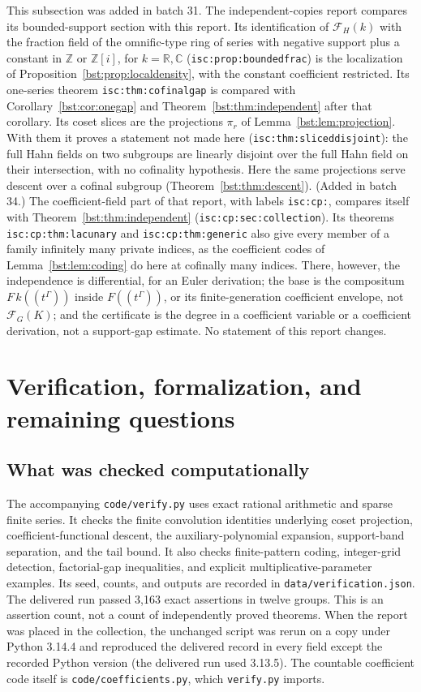 \documentclass[11pt,letterpaper]{article}
\theoremstyle{definition}
\theoremstyle{remark}
\newcommand{\R}{\mathbb R}
\newcommand{\C}{\mathbb C}
\newcommand{\Z}{\mathbb Z}
\newcommand{\FF}[2]{\mathcal F_{#2}(#1)}
\begin{document}
This subsection was added in batch 31. The independent-copies report
\cite{RepoIsc} compares its bounded-support section with this report. Its
identification of $\FF kH$ with the fraction field of the omnific-type ring of
series with negative support plus a constant in $\Z$ or $\Z[i]$, for $k=\R,\C$
(\texttt{isc:prop:boundedfrac}) is the localization of
Proposition~\ref{bst:prop:localdensity}, with the constant coefficient
restricted. Its one-series theorem \texttt{isc:thm:cofinalgap} is compared with
Corollary~\ref{bst:cor:onegap} and Theorem~\ref{bst:thm:independent} after that
corollary. Its coset slices are the projections $\pi_r$ of
Lemma~\ref{bst:lem:projection}. With them it proves a statement not made here
(\texttt{isc:thm:sliceddisjoint}): the full Hahn fields on two subgroups are
linearly disjoint over the full Hahn field on their intersection, with no
cofinality hypothesis. Here the same projections serve descent over a cofinal
subgroup (Theorem~\ref{bst:thm:descent}). (Added in batch 34.) The
coefficient-field part of that report, with labels \texttt{isc:cp:}, compares
itself with Theorem~\ref{bst:thm:independent} (\texttt{isc:cp:sec:collection}).
Its theorems \texttt{isc:cp:thm:lacunary} and \texttt{isc:cp:thm:generic} also
give every member of a family infinitely many private indices, as the
coefficient codes of Lemma~\ref{bst:lem:coding} do here at cofinally many
indices. There, however, the independence is differential, for an Euler
derivation; the base is the compositum $F\,k((t^\Gamma))$ inside
$F((t^\Gamma))$, or its finite-generation coefficient envelope, not
$\FF KG$; and the certificate is the degree in a coefficient variable or a
coefficient derivation, not a support-gap estimate. No statement of this
report changes.

\section{Verification, formalization, and remaining questions}\label{bst:sec:verification}

\subsection{What was checked computationally}

The accompanying \texttt{code/verify.py} uses exact rational arithmetic and sparse
finite series. It checks the finite convolution identities underlying
coset projection, coefficient-functional descent, the auxiliary-polynomial
expansion, support-band separation, and the tail bound. It also checks
finite-pattern coding, integer-grid detection, factorial-gap inequalities,
and explicit multiplicative-parameter examples. Its seed, counts, and
outputs are recorded in \texttt{data/verification.json}. The delivered run passed
3,163 exact assertions in twelve groups. This is an assertion count, not a
count of independently proved theorems. When the report was placed in the
collection, the unchanged script was rerun on a copy under Python 3.14.4 and
reproduced the delivered record in every field except the recorded Python
version (the delivered run used 3.13.5). The countable coefficient code
itself is \texttt{code/coefficients.py}, which \texttt{verify.py} imports.
\end{document}
